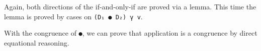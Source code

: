 \begin{fence}
\begin{code}
\AgdaSpace{}%
\AgdaSpace{}%
\AgdaSymbol{(}\AgdaSpace{}%
\AgdaSpace{}%
\AgdaSymbol{(}\AgdaSpace{}%
\AgdaSpace{}%
\AgdaSymbol{))}\AgdaSpace{}%
\AgdaSpace{}%
\AgdaOperator{\AgdaInductiveConstructor{,}}\AgdaSpace{}%
\AgdaSpace{}%
\AgdaSymbol{(}\AgdaSpace{}%
\AgdaSpace{}%
\AgdaSymbol{)}\AgdaSpace{}%
\AgdaSpace{}%
\AgdaSpace{}%
\<%
\end{code}
\end{fence}

Again, both directions of the if-and-only-if are proved via a lemma.
This time the lemma is proved by cases on \texttt{(D₁\ ●\ D₂)\ γ\ v}.

With the congruence of \texttt{●}, we can prove that application is a
congruence by direct equational reasoning.

